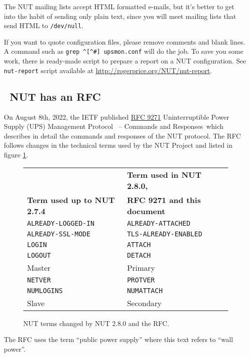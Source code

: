 \documentclass[12pt]{article}
\newlength{\headersep}\setlength{\headersep}{3mm}
\newcommand{\Hsep}{\hspace{\headersep}}
\newcommand{\RFCnumber}{9271}
\newcommand{\RFC}{\href{https://www.rfc-editor.org/info/rfc\RFCnumber}%
                       {RFC \RFCnumber} Uninterruptible Power Supply (UPS) Management Protocol\ %
                                        -- Commands and Responses}
\newcommand{\nutreport}{\texttt{nut-report} script available at
                         \href{http://rogerprice.org/NUT/nut-report}%
                              {http://{\allowbreak}rogerprice.org/{\allowbreak}NUT/{\allowbreak}nut-report}}
\begin{document}
The NUT mailing lists accept HTML formatted e-mails, but it's better to get
into the habit of sending only plain text, since you will meet mailing lists
that send HTML to \texttt{/dev/null}.

If you want to quote configuration files, please remove comments and blank
lines.  A command such as \verb`grep ^[^#] upsmon.conf` will do the job.  To
save you some work, there is ready-made script to prepare a report on a NUT
configuration. See \nutreport.

\subsection{\Hsep\ NUT has an RFC}\label{nut-RFC}

On August 8th, 2022, the IETF published \RFC\ which describes in
detail the commands and responses of the NUT protocol.  The RFC
follows changes in the technical terms used by the NUT Project and
listed in figure \ref{fig:terms}.

\begin{figure}[ht]
\begin{center}
\begin{tabular}{|l|l|}
\hline
                                   & \textbf{Term used in NUT 2.8.0,} \\
\textbf{Term used up to NUT 2.7.4} & \textbf{RFC 9271 and this document} \\ \hline\hline
{\tt ALREADY-LOGGED-IN}   & {\tt ALREADY-ATTACHED} \\ \hline
{\tt ALREADY-SSL-MODE}    & {\tt TLS-ALREADY-ENABLED} \\ \hline
{\tt LOGIN}               & {\tt ATTACH} \\ \hline
{\tt LOGOUT}              & {\tt DETACH} \\ \hline
Master                    & Primary \\ \hline
{\tt NETVER}              & {\tt PROTVER} \\ \hline
{\tt NUMLOGINS}           & {\tt NUMATTACH} \\ \hline
Slave                     & Secondary \\ \hline\hline
\end{tabular}
\caption{NUT terms changed by NUT 2.8.0 and the RFC.\label{fig:terms}}
\end{center}
\end{figure}

The RFC uses the term ``public power supply'' where this text refers to ``wall power''.
\end{document}
